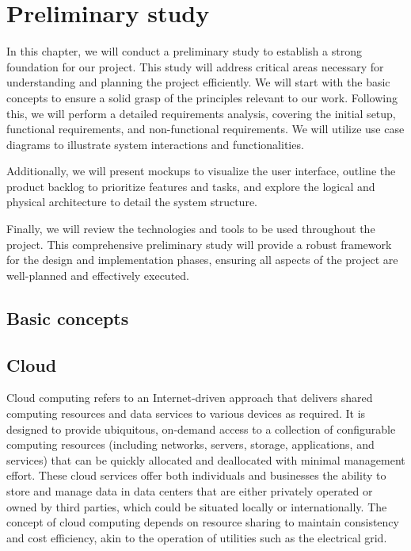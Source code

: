 \chapter{Preliminary study}

In this chapter, we will conduct a preliminary study to establish a strong foundation for our project. This study will address critical areas necessary for understanding and planning the project efficiently. We will start with the basic concepts to ensure a solid grasp of the principles relevant to our work. Following this, we will perform a detailed requirements analysis, covering the initial setup, functional requirements, and non-functional requirements. We will utilize use case diagrams to illustrate system interactions and functionalities.

Additionally, we will present mockups to visualize the user interface, outline the product backlog to prioritize features and tasks, and explore the logical and physical architecture to detail the system structure.

Finally, we will review the technologies and tools to be used throughout the project. This comprehensive preliminary study will provide a robust framework for the design and implementation phases, ensuring all aspects of the project are well-planned and effectively executed.

\pagebreak

\section{Basic concepts}

\section{Cloud}
Cloud computing refers to an Internet-driven approach that delivers shared computing resources and data services to various devices as required. It is designed to provide ubiquitous, on-demand access to a collection of configurable computing resources (including networks, servers, storage, applications, and services) that can be quickly allocated and deallocated with minimal management effort. These cloud services offer both individuals and businesses the ability to store and manage data in data centers that are either privately operated or owned by third parties, which could be situated locally or internationally. The concept of cloud computing depends on resource sharing to maintain consistency and cost efficiency, akin to the operation of utilities such as the electrical grid.


